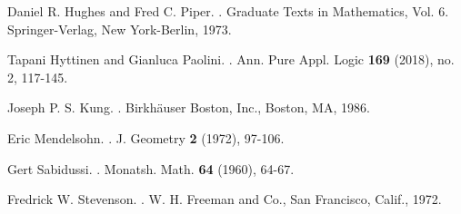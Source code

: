 \documentclass{amsart}
\numberwithin{claimcounter}{theorem}
\begin{document}
\begin{thebibliography}{10}
Daniel R. Hughes and Fred C. Piper.
.
\newblock Graduate Texts in Mathematics, Vol. 6. Springer-Verlag, New York-Berlin, 1973.

Tapani Hyttinen and Gianluca Paolini.
.
\newblock Ann. Pure Appl. Logic {\bf 169} (2018), no. 2, 117-145.

Joseph P. S. Kung.
.
\newblock Birkh\"auser Boston, Inc., Boston, MA, 1986.

Eric Mendelsohn.
.
\newblock J. Geometry {\bf 2} (1972), 97-106.

Gert Sabidussi.
.
\newblock Monatsh. Math. {\bf 64} (1960), 64-67.

Fredrick W. Stevenson.
.
\newblock W. H. Freeman and Co., San Francisco, Calif., 1972. 

\end{thebibliography}
	
\end{document}
